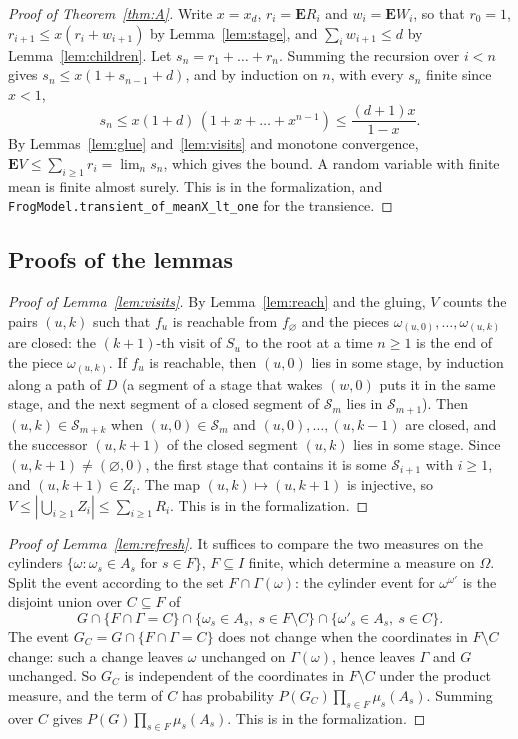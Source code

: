 \documentclass[11pt]{amsart}
\theoremstyle{definition}
\numberwithin{equation}{section}
\newcommand{\E}{\mathbf{E}}
\newcommand{\cS}{\mathcal{S}}
\begin{document}
\begin{proof}[Proof of Theorem~\ref{thm:A}]
Write $x=x_d$, $r_i=\E R_i$ and $w_i=\E W_i$, so that $r_0=1$, $r_{i+1}\le x(r_i+w_{i+1})$ by Lemma~\ref{lem:stage}, and $\sum_iw_{i+1}\le d$ by Lemma~\ref{lem:children}. Let $s_n=r_1+\dots+r_n$. Summing the recursion over $i<n$ gives $s_n\le x(1+s_{n-1}+d)$, and by induction on $n$, with every $s_n$ finite since $x<1$,
\[
s_n\le x(1+d)\,(1+x+\dots+x^{n-1})\le\frac{(d+1)x}{1-x}.
\]
By Lemmas~\ref{lem:glue} and~\ref{lem:visits} and monotone convergence, $\E V\le\sum_{i\ge1}r_i=\lim_ns_n$, which gives the bound. A random variable with finite mean is finite almost surely. This is  in the formalization, and \texttt{FrogModel.transient\_of\_meanX\_lt\_one} for the transience.
\end{proof}

\subsection{Proofs of the lemmas}

\begin{proof}[Proof of Lemma~\ref{lem:visits}]
By Lemma~\ref{lem:reach} and the gluing, $V$ counts the pairs $(u,k)$ such that $f_u$ is reachable from $f_\varnothing$ and the pieces $\omega_{(u,0)},\dots,\omega_{(u,k)}$ are closed: the $(k+1)$-th visit of $S_u$ to the root at a time $n\ge1$ is the end of the piece $\omega_{(u,k)}$. If $f_u$ is reachable, then $(u,0)$ lies in some stage, by induction along a path of $D$ (a segment of a stage that wakes $(w,0)$ puts it in the same stage, and the next segment of a closed segment of $\cS_m$ lies in $\cS_{m+1}$). Then $(u,k)\in\cS_{m+k}$ when $(u,0)\in\cS_m$ and $(u,0),\dots,(u,k-1)$ are closed, and the successor $(u,k+1)$ of the closed segment $(u,k)$ lies in some stage. Since $(u,k+1)\neq(\varnothing,0)$, the first stage that contains it is some $\cS_{i+1}$ with $i\ge1$, and $(u,k+1)\in Z_i$. The map $(u,k)\mapsto(u,k+1)$ is injective, so $V\le|\bigcup_{i\ge1}Z_i|\le\sum_{i\ge1}R_i$. This is  in the formalization.
\end{proof}

\begin{proof}[Proof of Lemma~\ref{lem:refresh}]
It suffices to compare the two measures on the cylinders $\{\omega:\omega_s\in A_s\text{ for } s\in F\}$, $F\subseteq I$ finite, which determine a measure on $\Omega$. Split the event according to the set $F\cap \Gamma(\omega)$: the cylinder event for $\omega^{\omega'}$ is the disjoint union over $C\subseteq F$ of
\[
G\cap\{F\cap \Gamma=C\}\cap\{\omega_s\in A_s,\ s\in F\setminus C\}\cap\{\omega'_s\in A_s,\ s\in C\}.
\]
The event $G_C=G\cap\{F\cap \Gamma=C\}$ does not change when the coordinates in $F\setminus C$ change: such a change leaves $\omega$ unchanged on $\Gamma(\omega)$, hence leaves $\Gamma$ and $G$ unchanged. So $G_C$ is independent of the coordinates in $F\setminus C$ under the product measure, and the term of $C$ has probability $P(G_C)\prod_{s\in F}\mu_s(A_s)$. Summing over $C$ gives $P(G)\prod_{s\in F}\mu_s(A_s)$. This is  in the formalization.
\end{proof}
\end{document}
